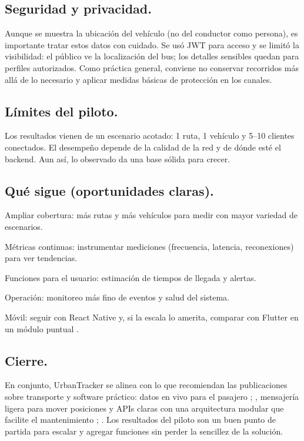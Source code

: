 \subsection{Seguridad y privacidad.}
Aunque se muestra la ubicación del vehículo (no del conductor como persona), es importante tratar estos datos con cuidado. Se usó JWT para acceso y se limitó la visibilidad: el público ve la localización del bus; los detalles sensibles quedan para perfiles autorizados. Como práctica general, conviene no conservar recorridos más allá de lo necesario y aplicar medidas básicas de protección en los canales.

\subsection{Límites del piloto.}
Los resultados vienen de un escenario acotado: 1 ruta, 1 vehículo y 5–10 clientes conectados. El desempeño depende de la calidad de la red y de dónde esté el backend. Aun así, lo observado da una base sólida para crecer.

\subsection{Qué sigue (oportunidades claras).}
Ampliar cobertura: más rutas y más vehículos para medir con mayor variedad de escenarios.

Métricas continuas: instrumentar mediciones (frecuencia, latencia, reconexiones) para ver tendencias.

Funciones para el usuario: estimación de tiempos de llegada y alertas.

Operación: monitoreo más fino de eventos y salud del sistema.

Móvil: seguir con React Native y, si la escala lo amerita, comparar con Flutter en un módulo puntual \cite{flutter2022new}.

\subsection{Cierre.}
En conjunto, UrbanTracker se alinea con lo que recomiendan las publicaciones sobre transporte y software práctico: datos en vivo para el pasajero \cite{cityruta2018}; \cite{stopbus2016}, mensajería ligera para mover posiciones \cite{sismo2016} y APIs claras con una arquitectura modular que facilite el mantenimiento \cite{easyrest2022}; \cite{poo2023}. Los resultados del piloto son un buen punto de partida para escalar y agregar funciones sin perder la sencillez de la solución.